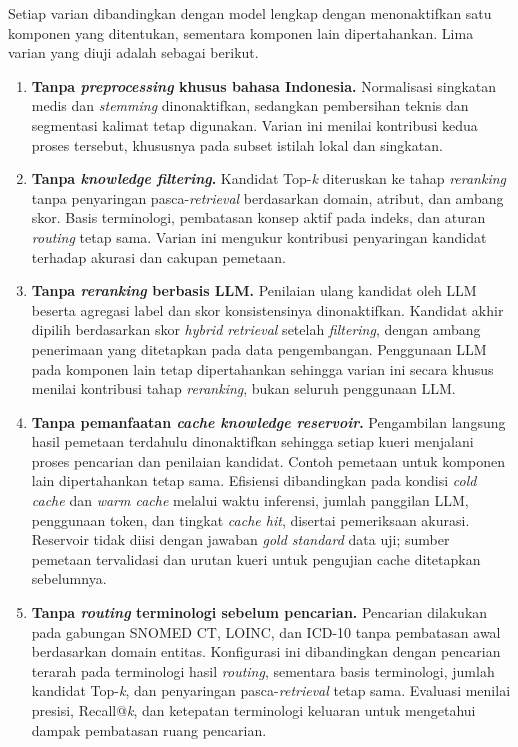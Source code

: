 Setiap varian dibandingkan dengan model lengkap dengan menonaktifkan satu komponen yang ditentukan, sementara komponen lain dipertahankan. Lima varian yang diuji adalah sebagai berikut.

\begin{enumerate}
    \item \textbf{Tanpa \textit{preprocessing} khusus bahasa Indonesia.} Normalisasi singkatan medis dan \textit{stemming} dinonaktifkan, sedangkan pembersihan teknis dan segmentasi kalimat tetap digunakan. Varian ini menilai kontribusi kedua proses tersebut, khususnya pada subset istilah lokal dan singkatan.
    \item \textbf{Tanpa \textit{knowledge filtering}.} Kandidat Top-\textit{k} diteruskan ke tahap \textit{reranking} tanpa penyaringan pasca-\textit{retrieval} berdasarkan domain, atribut, dan ambang skor. Basis terminologi, pembatasan konsep aktif pada indeks, dan aturan \textit{routing} tetap sama. Varian ini mengukur kontribusi penyaringan kandidat terhadap akurasi dan cakupan pemetaan.
    \item \textbf{Tanpa \textit{reranking} berbasis LLM.} Penilaian ulang kandidat oleh LLM beserta agregasi label dan skor konsistensinya dinonaktifkan. Kandidat akhir dipilih berdasarkan skor \textit{hybrid retrieval} setelah \textit{filtering}, dengan ambang penerimaan yang ditetapkan pada data pengembangan. Penggunaan LLM pada komponen lain tetap dipertahankan sehingga varian ini secara khusus menilai kontribusi tahap \textit{reranking}, bukan seluruh penggunaan LLM.
    \item \textbf{Tanpa pemanfaatan \textit{cache knowledge reservoir}.} Pengambilan langsung hasil pemetaan terdahulu dinonaktifkan sehingga setiap kueri menjalani proses pencarian dan penilaian kandidat. Contoh pemetaan untuk komponen lain dipertahankan tetap sama. Efisiensi dibandingkan pada kondisi \textit{cold cache} dan \textit{warm cache} melalui waktu inferensi, jumlah panggilan LLM, penggunaan token, dan tingkat \textit{cache hit}, disertai pemeriksaan akurasi. Reservoir tidak diisi dengan jawaban \textit{gold standard} data uji; sumber pemetaan tervalidasi dan urutan kueri untuk pengujian cache ditetapkan sebelumnya.
    \item \textbf{Tanpa \textit{routing} terminologi sebelum pencarian.} Pencarian dilakukan pada gabungan SNOMED CT, LOINC, dan ICD-10 tanpa pembatasan awal berdasarkan domain entitas. Konfigurasi ini dibandingkan dengan pencarian terarah pada terminologi hasil \textit{routing}, sementara basis terminologi, jumlah kandidat Top-\textit{k}, dan penyaringan pasca-\textit{retrieval} tetap sama. Evaluasi menilai presisi, Recall@\textit{k}, dan ketepatan terminologi keluaran untuk mengetahui dampak pembatasan ruang pencarian.
\end{enumerate}


